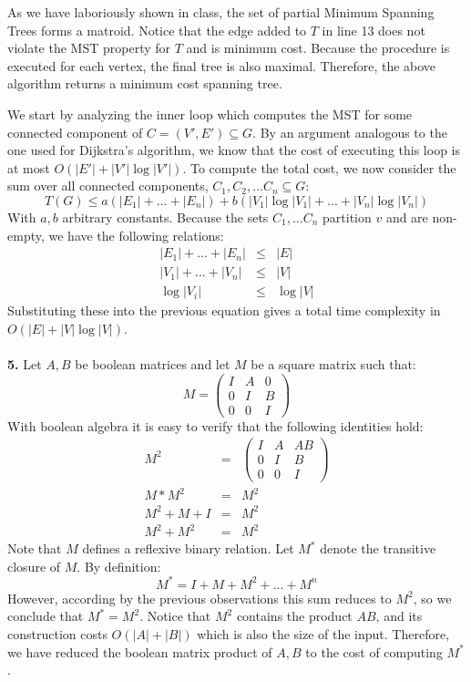 \documentclass{article}
\begin{document}
As we have laboriously shown in class, the set of partial Minimum Spanning Trees forms a matroid.  Notice that the edge added to $T$ in line 13 does not violate the MST property for $T$ and is minimum cost.  Because the procedure is executed for each vertex, the final tree is also maximal.  Therefore, the above algorithm returns a minimum cost spanning tree.

We start by analyzing the inner loop which computes the MST for some connected component of $C = (V',E') \subseteq G$.  By an argument analogous to the one used for Dijkstra's algorithm, we know that the cost of executing this loop is at most $O( |E'| + |V'| \log{|V'|} )$.  To compute the total cost, we now consider the sum over all connected components, $C_1, C_2, ... C_n \subseteq G$:
\[ T(G) \leq a ( |E_1| + ... + |E_n| ) + b( |V_1| \log{|V_1|} + ... + |V_n| \log{|V_n|})\]
With $a,b$ arbitrary constants.  Because the sets $C_1, ... C_n$ partition $v$ and are non-empty, we have the following relations:
\begin{eqnarray*}
|E_1| + ... + |E_n| & \leq & |E| \\
|V_1| + ... + |V_n| & \leq & |V| \\
\log{|V_i|} & \leq & \log{|V|}
\end{eqnarray*}
Substituting these into the previous equation gives a total time complexity in $O(|E| + |V| \log{|V|})$.

\paragraph{} \textbf{5.}
Let $A,B$ be boolean matrices and let $M$ be a square matrix such that:
\[
M = 
\begin{pmatrix}
I & A & 0 \\
0 & I & B \\
0 & 0 & I
\end{pmatrix} \]
With boolean algebra it is easy to verify that the following identities hold:
\begin{eqnarray*}
M^2 & = & \begin{pmatrix}
I & A & AB \\
0 & I & B \\
0 & 0 & I
\end{pmatrix} \\
M * M^2 & = & M^2 \\
M^2 + M + I & = & M^2 \\
M^2 + M^2 & = & M^2
\end{eqnarray*}
Note that $M$ defines a reflexive binary relation.  Let $M^*$ denote the transitive closure of $M$.  By definition:
\[ M^* = I + M + M^2 + ... + M^n \]
However, according by the previous observations this sum reduces to $M^2$, so we conclude that $M^* = M^2$.  Notice that $M^2$ contains the product $AB$, and its construction costs $O(|A| + |B|)$ which is also the size of the input.  Therefore, we have reduced the boolean matrix product of $A,B$ to the cost of computing $M^*$.
\end{document}

